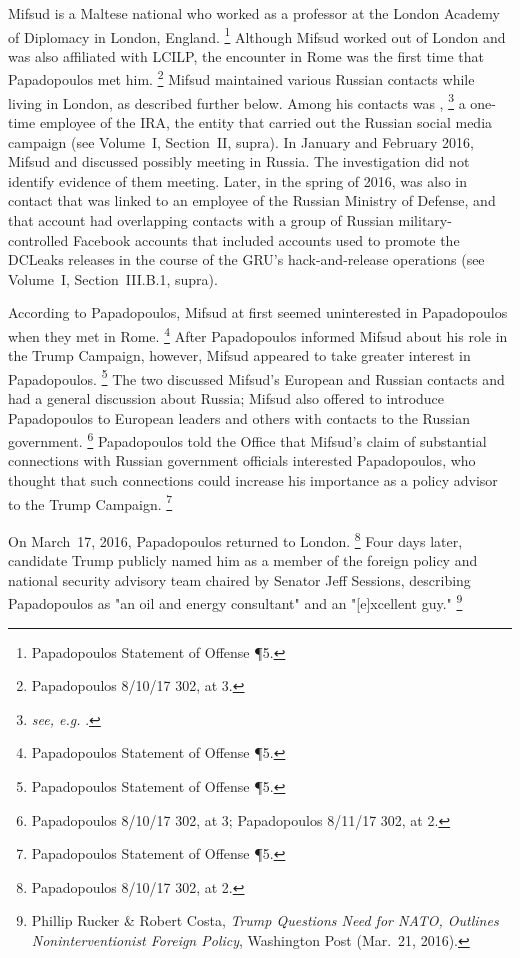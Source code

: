 Mifsud is a Maltese national who worked as a professor at the London Academy of Diplomacy in London, England.%
\footnote{Papadopoulos Statement of Offense \P 5.}
Although Mifsud worked out of London and was also affiliated with LCILP, the encounter in Rome was the first time that Papadopoulos met him.%
\footnote{Papadopoulos 8/10/17 302, at 3.}
Mifsud maintained various Russian contacts while living in London, as described further below.
Among his contacts was ,%
\footnote{\textit{see, e.g.} .
}
a one-time employee of the IRA, the entity that carried out the Russian social media campaign (see Volume~I, Section~II, supra).
In January and February 2016, Mifsud and  discussed  possibly meeting in Russia.
The investigation did not identify evidence of them meeting.
Later, in the spring of 2016,  was also in contact  that was linked to an employee of the Russian Ministry of Defense, and that account had overlapping contacts with a group of Russian military-controlled Facebook accounts that included accounts used to promote the DCLeaks releases in the course of the GRU's hack-and-release operations (see Volume~I, Section~III.B.1, supra).

According to Papadopoulos, Mifsud at first seemed uninterested in Papadopoulos when they met in Rome.%
\footnote{Papadopoulos Statement of Offense \P 5.}
After Papadopoulos informed Mifsud about his role in the Trump Campaign, however, Mifsud appeared to take greater interest in Papadopoulos.%
\footnote{Papadopoulos Statement of Offense \P 5.}
The two discussed Mifsud's European and Russian contacts and had a general discussion about Russia; Mifsud also offered to introduce Papadopoulos to European leaders and others with contacts to the Russian government.%
\footnote{Papadopoulos 8/10/17 302, at 3; Papadopoulos 8/11/17 302, at 2.}
Papadopoulos told the Office that Mifsud's claim of substantial connections with Russian government officials interested Papadopoulos, who thought that such connections could increase his importance as a policy advisor to the Trump Campaign.%
\footnote{Papadopoulos Statement of Offense \P 5.}

On March~17, 2016, Papadopoulos returned to London.%
\footnote{Papadopoulos 8/10/17 302, at 2.}
Four days later, candidate Trump publicly named him as a member of the foreign policy and national security advisory team chaired by Senator Jeff Sessions, describing Papadopoulos as "an oil and energy consultant" and an "[e]xcellent guy."%
\footnote{Phillip Rucker \& Robert Costa, \textit{Trump Questions Need for NATO, Outlines Noninterventionist Foreign Policy}, Washington Post (Mar.~21, 2016).}

